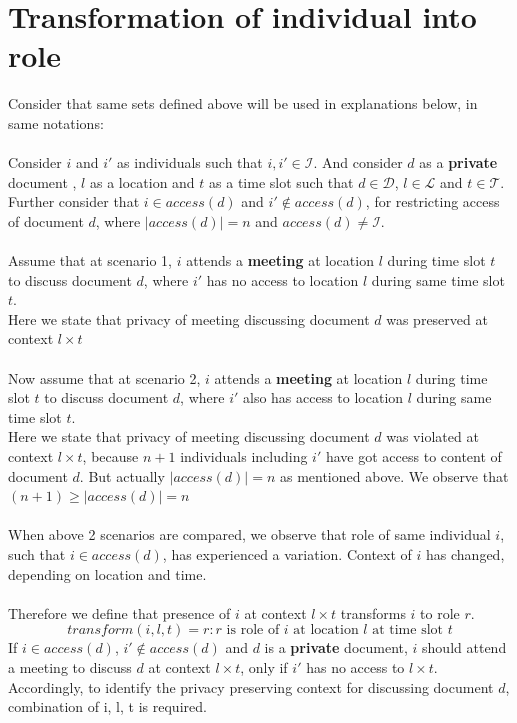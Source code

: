 \documentclass{article}
\begin{document}
\section{Transformation of individual into role}
\noindent
Consider that same sets defined above will be used in explanations below, in same notations: \\ \\
\noindent
Consider $i$ and $i'$ as individuals such that $i, i' \in \mathcal{I}$. And consider $d$ as a \textbf{private} document , $l$ as a location and $t$ as a time slot such that $d \in \mathcal{D}$, $l \in \mathcal{L}$ and $t \in \mathcal{T}$.
Further consider that $i \in access(d)$ and $i' \notin access(d)$, for restricting access of document $d$, where $|access(d)| = n$ and $access(d) \ne \mathcal{I}$.\\ \\
\noindent
Assume that at scenario 1, $i$ attends a \textbf{meeting} at location $l$ during time slot $t$ to discuss document $d$, where $i'$ has no access to location $l$ during same time slot $t$. \\
Here we state that privacy of meeting discussing document $d$ was preserved at context $l \times t$ \\ \\ 
\noindent
Now assume that at scenario 2, $i$ attends a \textbf{meeting} at location $l$ during time slot $t$ to discuss document $d$, where $i'$ also has access to location $l$ during same time slot $t$. \\
Here we state that privacy of meeting discussing document $d$ was violated at context $l \times t$, because $n + 1$ individuals including $i'$ have got access to content of document $d$. But actually $|access(d)| = n$ as mentioned above. We observe that $(n + 1) \geq |access(d)| = n$ \\ \\ 
\noindent
When above 2 scenarios are compared, we observe that role of same individual $i$, such that $i \in access(d)$, has experienced a variation. Context of $i$ has changed, depending on location and time. \\ \\
Therefore we define that presence of $i$ at context $l \times t$ transforms $i$ to role $r$.
\[ transform(i, l, t) = r : r \text{ is role of } i \text{ at location } l \text{ at time slot } t \] 
\noindent
If $i \in access(d)$, $i' \notin access(d)$ and $d$ is a \textbf{private} document, $i$ should attend a meeting to discuss $d$ at context $l \times t$, only if $i'$ has no access to $l \times t$. Accordingly, to identify the privacy preserving context for discussing document $d$, combination of i, l, t is required.\\ \\
\end{document}
